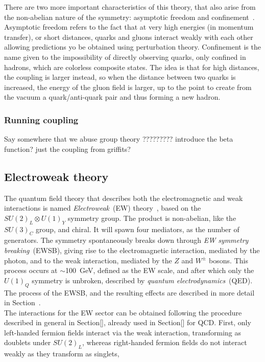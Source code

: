 There are two more important characteristics of this theory, that also arise from the non-abelian nature of the symmetry: asymptotic freedom and confinement~\cite{PhysRevLett.30.1346,PhysRevLett.30.1343}. Asymptotic freedom refers to the fact that at very high energies (in momentum transfer), or short distances, quarks and gluons interact weakly with each other allowing predictions yo be obtained using perturbation theory. Confinement is the name given to the impossibility of directly observing quarks, only confined in hadrons, which are colorless composite states. The idea is that for high distances, the coupling is larger instead, so when the distance between two quarks is increased, the energy of the gluon field is larger, up to the point to create from the vacuum a quark/anti-quark pair and thus forming a new hadron.\\

\subsubsection{Running coupling}
Say somewhere that we abuse group theory
?????????
introduce the beta function? just the coupling from griffits?

\subsection{Electroweak theory}

The quantum field theory that describes both the electromagnetic and weak interactions is named \textit{Electroweak}~(EW) theory~\cite{PhysRevLett.19.1264,Salam:1968rm,GLASHOW1961579}, based on the $SU(2)_L\otimes U(1)_Y$ symmetry group. The product is non-abelian, like the $SU(3)_C$ group, and chiral. It will spawn four mediators, as the number of generators. The symmetry spontaneously breaks down through \textit{EW symmetry breaking}~(EWSB), giving rise to the electromagnetic interaction, mediated by the photon, and to the weak interaction, mediated by the $Z$ and $W^\pm$ bosons. This process occurs at $\sim$100~GeV, defined as the EW scale, and after which only the $U(1)_Q$ symmetry is unbroken, described by \textit{quantum electrodynamics}~(QED). The process of the EWSB, and the resulting effects are described in more detail in Section~.\\

The interactions for the EW sector can be obtained following the procedure described in general in Section[], already used in Section[] for QCD. First, only left-handed fermion fields interact via the weak interaction, transforming as doublets under $SU(2)_L$, whereas right-handed fermion fields do not interact weakly as they transform as singlets,

